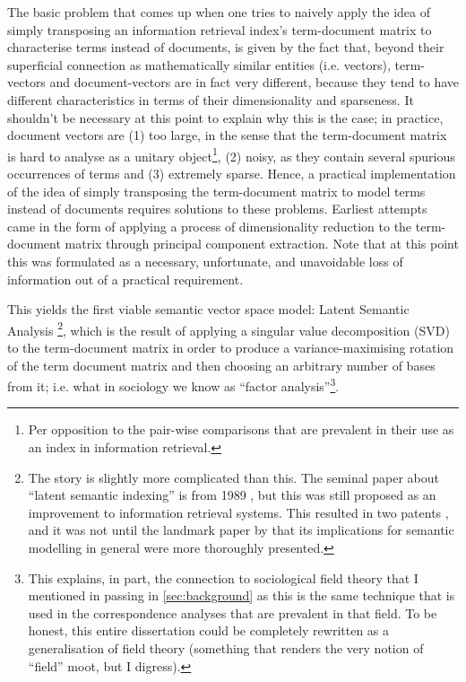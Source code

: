 The basic problem that comes up when one tries to naively apply the idea of simply transposing an information retrieval index's term-document matrix to characterise terms instead of documents, is given by the fact that, beyond their superficial connection as mathematically similar entities (i.e. vectors), term-vectors and document-vectors are in fact very different, because they tend to have different characteristics in terms of their dimensionality and sparseness.
It shouldn't be necessary at this point to explain why this is the case; in practice, document vectors are (1) too large, in the sense that the term-document matrix is hard to analyse as a unitary object\footnote{
   Per opposition to the pair-wise comparisons that are prevalent in their use as an index in information retrieval.
}, (2) noisy, as they contain several spurious occurrences of terms and (3) extremely sparse.
Hence, a practical implementation of the idea of simply transposing the term-document matrix to model terms instead of documents requires solutions to these problems.
Earliest attempts came in the form of applying a process of dimensionality reduction to the term-document matrix through principal component extraction.
Note that at this point this was formulated as a necessary, unfortunate, and unavoidable loss of information out of a practical requirement.

This yields the first viable semantic vector space model: Latent Semantic Analysis \citep{landauer1997,landauer1998}\footnote{
    \label{foot:in_it_for_the_money}
    The story is slightly more complicated than this.
    The seminal paper about ``latent semantic indexing'' is from 1989 \citep{deerwester1988}, but this was still proposed as an improvement to information retrieval systems.
    This resulted in two patents \citep{deerwester1989,landauer1994}, and it was not until the landmark paper by \citet{landauer1997} that its implications for semantic modelling in general were more thoroughly presented.
}, which is the result of applying a singular value decomposition (SVD) to the term-document matrix in order to produce a variance-maximising rotation of the term document matrix and then choosing an arbitrary number of bases from it; i.e. what in sociology we know as ``factor analysis''\footnote{
    This explains, in part, the connection to sociological field theory that I mentioned in passing in \autoref{sec:background} as this is the same technique that is used in the correspondence analyses that are prevalent in that field.
    To be honest, this entire dissertation could be completely rewritten as a generalisation of field theory (something that renders the very notion of ``field'' moot, but I digress).
}.

